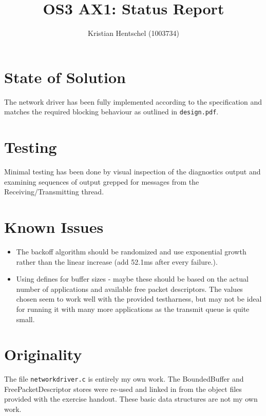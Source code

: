 \documentclass{article}
\title{OS3 AX1: Status Report}
\author{Kristian Hentschel (1003734)}
\begin{document}
\maketitle
\section{State of Solution}
The network driver has been fully implemented according to the specification and matches the required blocking behaviour as outlined in \texttt{design.pdf}.

\section{Testing}
Minimal testing has been done by visual inspection of the diagnostics output and examining sequences of output grepped for messages from the Receiving/Transmitting thread.

\section{Known Issues}
\begin{itemize}
	\item The backoff algorithm should be randomized and use exponential growth rather than the linear increase (add 52.1ms after every failure.).
	\item Using defines for buffer sizes - maybe these should be based on the actual number of applications and available free packet descriptors. The values chosen seem to work well with the provided testharness, but may not be ideal for running it with many more applications as the transmit queue is quite small.
\end{itemize}

\section{Originality}
The file \texttt{networkdriver.c} is entirely my own work. The BoundedBuffer and FreePacketDescriptor stores were re-used and linked in from the object files provided with the exercise handout. These basic data structures are not my own work.
\end{document}
